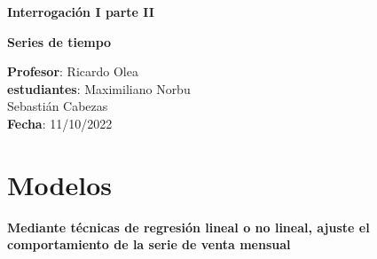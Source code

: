 \documentclass[10pt,A4]{article}
\begin{document}
\begin{center} 
\textbf{\Large Interrogación I parte II} 
\end{center}

\begin{center}
\textbf{ \LARGE{Series de tiempo}}
\end{center}

\begin{flushright}
    \noindent \textbf{Profesor}: Ricardo Olea\\
    \noindent \textbf{estudiantes}: Maximiliano Norbu \\ Sebastián Cabezas\\
    \noindent \textbf{Fecha}: 11/10/2022
\end{flushright}

\bigskip
\bigskip

    \section*{Modelos}

    \textbf{Mediante técnicas de regresión lineal o no lineal, ajuste el comportamiento de la serie de venta mensual}
    
\end{document}

